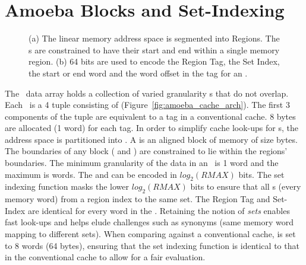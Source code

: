 \section{Amoeba Blocks and Set-Indexing}
\label{sec:amoeba_blocks_and_set_indexing}

\begin{figure}[h]
  \caption[Memory Regions]{ (a) The linear memory address space is segmented into Regions. The \AB{}s are constrained to have their start and end within a single memory region. (b) 64 bits are used to encode the Region Tag, the Set Index, the start or end word and the word offset in the tag for an \AB{}.  }
  \label{fig:mem_region_addr}
\end{figure}


The \AC\ data array holds a collection of varied granularity \AB{}s that do not overlap. Each \AB\ is a 4 tuple consisting of  (Figure~\ref{fig:amoeba_cache_arch}). The first 3 components of the tuple are equivalent to a tag in a conventional cache. 8 bytes are allocated (1 word) for each tag. In order to simplify cache look-ups for \AB{}s, the address space is partitioned into . A  is an aligned block of memory of size  bytes. The boundaries of any \AB{} block ( and ) are constrained to lie within the regions' boundaries. The minimum granularity of the data in an \AB\ is 1 word and the maximum is  words. The  and  can be encoded in $log_2(RMAX)$ bits. The set indexing function masks the lower $log_2(RMAX)$ bits to ensure that all \AB{}s (every memory word) from a region index to the same set. The Region Tag and Set-Index are identical for every word in the \AB{}. Retaining the notion of \textit{sets} enables fast look-ups and helps elude challenges such as synonyms (same memory word mapping to different sets). When comparing against a conventional cache,  is set to 8 words (64 bytes), ensuring that the set indexing function is identical to that in the conventional cache to allow for a fair evaluation.



